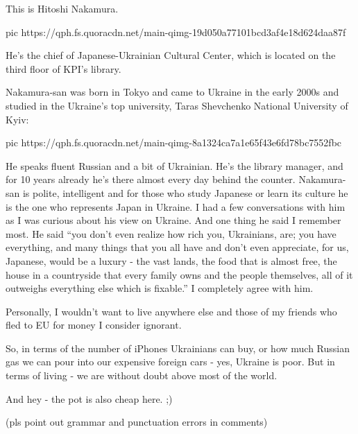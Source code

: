 This is Hitoshi Nakamura.

\ifcmt
	pic https://qph.fs.quoracdn.net/main-qimg-19d050a77101bcd3af4e18d624daa87f
\fi

He’s the chief of Japanese-Ukrainian Cultural Center, which is located on the
third floor of KPI’s library.

Nakamura-san was born in Tokyo and came to Ukraine in the early 2000s and
studied in the Ukraine’s top university, Taras Shevchenko National University
of Kyiv:

\ifcmt
	pic https://qph.fs.quoracdn.net/main-qimg-8a1324ca7a1e65f43e6fd78bc7552fbc
\fi

He speaks fluent Russian and a bit of Ukrainian. He’s the library manager, and
for 10 years already he’s there almost every day behind the counter.
Nakamura-san is polite, intelligent and for those who study Japanese or learn
its culture he is the one who represents Japan in Ukraine. I had a few
conversations with him as I was curious about his view on Ukraine. And one
thing he said I remember most. He said “you don’t even realize how rich you,
Ukrainians, are; you have everything, and many things that you all have and
don’t even appreciate, for us, Japanese, would be a luxury - the vast lands,
the food that is almost free, the house in a countryside that every family owns
and the people themselves, all of it outweighs everything else which is
fixable.” I completely agree with him.

Personally, I wouldn’t want to live anywhere else and those of my friends who
fled to EU for money I consider ignorant.

So, in terms of the number of iPhones Ukrainians can buy, or how much Russian
gas we can pour into our expensive foreign cars - yes, Ukraine is poor. But in
terms of living - we are without doubt above most of the world.

And hey - the pot is also cheap here. ;)

(pls point out grammar and punctuation errors in comments)
